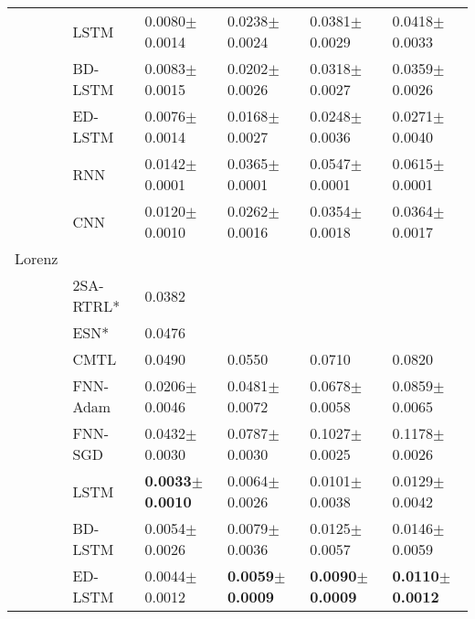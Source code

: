 \documentclass{ieeeaccess}
\begin{document}
\begin{table*}[htbp!]
\begin{tabular}{llllll}
&LSTM   &   0.0080$\pm$	0.0014   	&    0.0238$\pm$	0.0024    &0.0381$\pm$	0.0029	       &0.0418$\pm$	0.0033\\

&BD-LSTM   &   0.0083$\pm$	0.0015   	&   0.0202$\pm$	0.0026     &0.0318$\pm$	0.0027	       &0.0359$\pm$	0.0026\\

&ED-LSTM   &   0.0076$\pm$	0.0014   	&    0.0168$\pm$	0.0027    &	0.0248$\pm$	0.0036       &0.0271$\pm$	0.0040\\

&RNN  &    0.0142$\pm$	0.0001  	&   0.0365$\pm$	0.0001     &0.0547$\pm$	0.0001	       &0.0615$\pm$	0.0001\\

&CNN &     0.0120$\pm$		0.0010 	&   0.0262$\pm$		0.0016     &0.0354$\pm$		0.0018	       &0.0364$\pm$		0.0017\\

\hline





Lorenz &    	   &	& \\
 


 &2SA-RTRL*\cite{chang2012reinforced}  &  0.0382	   &	 &  \\



 &ESN*\cite{chang2012reinforced}&    0.0476 	   &	&   \\
 
 &CMTL \cite{chandra2017CMTLMulti} & 0.0490	 &  0.0550	&0.0710 & 0.0820  \\
&FNN-Adam &    0.0206$\pm$	0.0046  	&  0.0481$\pm$	0.0072      & 0.0678$\pm$	0.0058	       &0.0859$\pm$	0.0065\\

&FNN-SGD  & 0.0432$\pm$	0.0030     	&   0.0787$\pm$	0.0030     &0.1027$\pm$	0.0025	       &0.1178$\pm$	0.0026\\

&LSTM   & \textbf{0.0033$\pm$	0.0010}     	&  0.0064$\pm$	0.0026      &	0.0101$\pm$	0.0038       &0.0129$\pm$	0.0042\\

&BD-LSTM   & 0.0054$\pm$	0.0026     	&  0.0079$\pm$	0.0036      &0.0125$\pm$	0.0057	       &0.0146$\pm$	0.0059\\

&ED-LSTM   &0.0044$\pm$	0.0012      	&  \textbf{0.0059$\pm$	0.0009}      &\textbf{0.0090$\pm$	0.0009}	       &\textbf{0.0110$\pm$	0.0012}\\


\end{tabular}
\end{table*}
\end{document}
